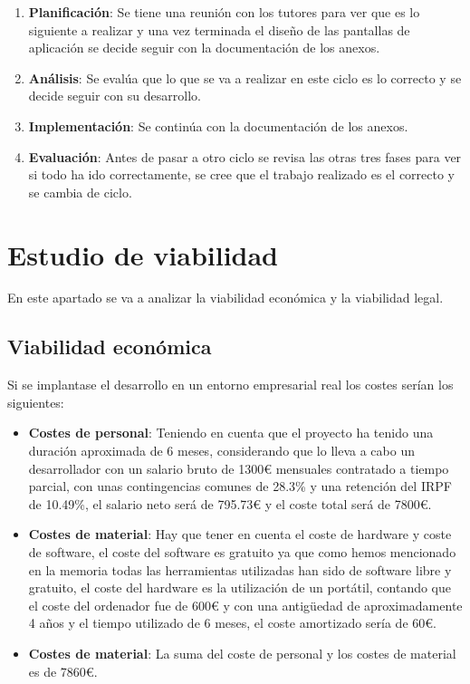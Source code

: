 \begin{enumerate}
	\item \textbf{Planificación}: Se tiene una reunión con los tutores para ver que es lo siguiente a realizar y una vez terminada el diseño de las pantallas de aplicación se decide seguir con la documentación de los anexos.
	\item \textbf{Análisis}: Se evalúa que lo que se va a realizar en este ciclo es lo correcto y se decide seguir con su desarrollo.
	\item \textbf{Implementación}: Se continúa con la documentación de los anexos.
	\item \textbf{Evaluación}: Antes de pasar a otro ciclo se revisa las otras tres fases para ver si todo ha ido correctamente, se cree que el trabajo realizado es el correcto y se cambia de ciclo.
\end{enumerate}

\section{Estudio de viabilidad}

En este apartado se va a analizar la viabilidad económica y la viabilidad legal.


\subsection{Viabilidad económica}

Si se implantase el desarrollo en un entorno empresarial real los costes serían los siguientes:

\begin{itemize}
	\item \textbf{Costes de personal}: Teniendo en cuenta que el proyecto ha tenido una duración aproximada de 6 meses, considerando que lo lleva a cabo un desarrollador con un salario bruto de 1300\textup{\euro} mensuales contratado a tiempo parcial, con unas contingencias comunes\cite{seguridadSocial} de 28.3\%  y una retención del IRPF de 10.49\%, el salario neto será de 795.73\textup{\euro} y el coste total será de 7800\textup{\euro}.
	
	\item \textbf{Costes de material}: Hay que tener en cuenta el coste de hardware y coste de software, el coste del software es gratuito ya que como hemos mencionado en la memoria todas las herramientas utilizadas han sido de software libre y gratuito, el coste del hardware es la utilización de un portátil, contando que el coste del ordenador fue de 600\textup{\euro} y con una antigüedad de aproximadamente 4 años y el tiempo utilizado de 6 meses, el coste amortizado sería de 60\textup{\euro}.
	
	\item \textbf{Costes de material}: La suma del coste de personal y los costes de material es de 7860\textup{\euro}.

\end{itemize}

